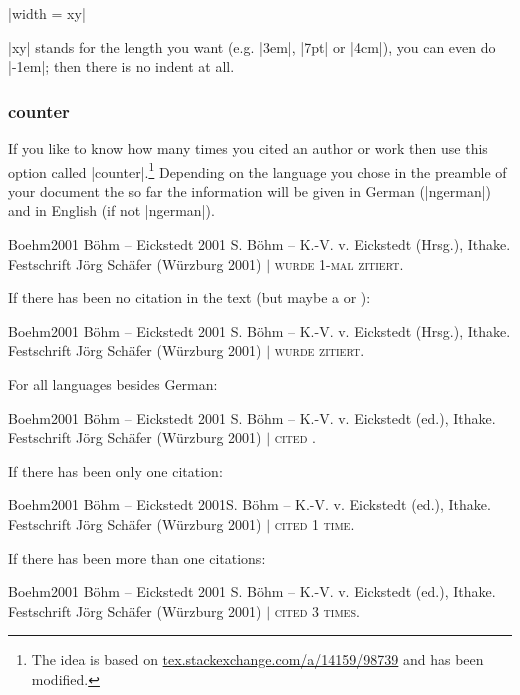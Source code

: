 \documentclass[a4paper,
10pt,
greek,
french,
spanish,
italian,
ngerman,
english
]{ltxdoc}
\begin{document}
|width = xy|

|xy|  stands for the length you want  (e.g. |3em|, |7pt| or |4cm|), you can even do |-1em|; 
then there is no indent at all.

\subsubsection{counter}\label{counter}
 If you like to know how many times you cited an author or work then use this option called |counter|.\footnote{The idea is based on \href{http://tex.stackexchange.com/a/14159/98739}{tex.stackexchange.com/a/14159/98739} and has been modified.}
Depending on the language you chose in the preamble of your document the so far the information will be given in German (|ngerman|) and in English (if not |ngerman|).
\begin{bibbsp}{Boehm2001}
Böhm – Eickstedt 2001 \hspace{3em} S. Böhm – K.-V. v. Eickstedt (Hrsg.), Ithake. Festschrift Jörg Schäfer (Würzburg 2001)  $\vert$  {\scshape  wurde 1-mal zitiert.}
\end{bibbsp}
If there has been no citation in the text (but maybe a  or ):
\begin{bibbsp}{Boehm2001}
Böhm – Eickstedt 2001\hspace{3em} S. Böhm – K.-V. v. Eickstedt (Hrsg.), Ithake. Festschrift Jörg Schäfer (Würzburg 2001)  $\vert$  {\scshape  wurde {\color{red}{keinmal}} zitiert.}
\end{bibbsp} 

For all languages besides German:
\begin{bibbsp}{Boehm2001}
Böhm – Eickstedt 2001 \hspace{3em}  S. Böhm – K.-V. v. Eickstedt (ed.), Ithake. Festschrift Jörg Schäfer (Würzburg 2001) $\vert$  {\scshape cited {{\color{red}{not once}}}.}
 \end{bibbsp}
  
 If there has been only one citation:
\begin{bibbsp}{Boehm2001}
Böhm – Eickstedt 2001\hspace{3em}S. Böhm – K.-V. v. Eickstedt (ed.), Ithake. Festschrift Jörg Schäfer (Würzburg 2001) $\vert$  {\scshape cited 1 time.}
 \end{bibbsp}

 If there has been more than one citations:
\begin{bibbsp}{Boehm2001}
Böhm – Eickstedt 2001\hspace{3em} S. Böhm – K.-V. v. Eickstedt (ed.), Ithake. Festschrift Jörg Schäfer (Würzburg 2001) $\vert$  {\scshape cited 3 times.}
\end{bibbsp}
 
\end{document}
